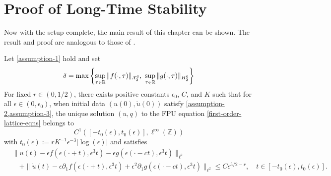 \section{Proof of Long-Time Stability}

Now with the setup complete, the main result of this chapter can be shown. The result and proof are analogous to those of \cite[Thm.~1]{khan2017long}.

\begin{theorem}
	Let \cref{assumption-1} hold and set 
	\begin{equation}
		\delta = \max \left\{\sup_{\tau\in\mathbb{R}}\|f(\cdot,\tau)\|_{\mathcal{X}^6_2},\ \sup_{\tau\in \mathbb{R}} \|g(\cdot, \tau)\|_{H^6_2} \right\}
	\end{equation}
	For fixed \(r\in(0,1/2)\), there exists positive constants \(\epsilon_0\), \(C\), and \(K\) such that for all \(\epsilon \in(0,\epsilon_0)\), when initial data \((u(0), \dot u(0))\) satisfy \cref{assumption-2,assumption-3}, the unique solution \((u,q)\) to the FPU equation \cref{first-order-lattice-eqns} belongs to 
	\begin{equation}
		C^1([-t_0(\epsilon), t_0(\epsilon)], \ell^\infty(\mathbb Z))
	\end{equation}
	with \(t_0(\epsilon):= r K^{-1} \epsilon^{-3} | \log (\epsilon) | \) and satisfies
	\begin{equation}
	\begin{aligned}
		&\| u(t) - \epsilon f(\epsilon(\cdot+t), \epsilon^3 t) -\epsilon g(\epsilon(\cdot -ct) ,\epsilon^3 t) \|_{\ell^2} \\
		&\quad + \| \dot u(t) - \epsilon \partial_1 f(\epsilon (\cdot +t),\epsilon^3t)  +\epsilon^2 \partial_1 g(\epsilon(\cdot - ct), \epsilon^3t)\|_{\ell^2} \leq C \epsilon^{5/2 - r}, \quad t\in[-t_0(\epsilon), t_0(\epsilon)].
	\end{aligned}
	\end{equation}
\end{theorem}

